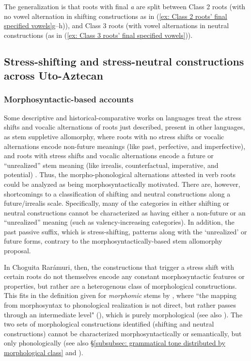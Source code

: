     \z

The generalization is that roots with final \textit{a} are split between Class 2 roots (with no vowel alternation in shifting constructions as in (\ref{ex: Class 2 roots’ final specified vowels}g--h)), and Class 3 roots (with vowel alternations in neutral constructions (as in (\ref{ex: Class 3 roots’ final specified vowels})).

\subsection{Stress-shifting and stress-neutral constructions across Uto-Aztecan}
\label{subsec: semantic accounts of shifting and neutral constructions in Uto-Aztecan}

\subsubsection{Morphosyntactic-based accounts}
\label{subsubsec: morphosyntactic and semantic accounts}

Some descriptive and historical-comparative works on  languages treat the stress shifts and vocalic alternations of roots just described, present in other  languages, as stem suppletive allomorphy, where roots with no stress shifts or vocalic alternations encode non-future meanings (like past, perfective, and imperfective), and roots with stress shifts and vocalic alternations encode a future or ``unrealized'' stem meaning (like irrealis, counterfactual, imperative, and potential) \citep[][133]{langacker1977uto}. Thus, the morpho-phonological alternations attested in verb roots could be analyzed as being morphosyntactically motivated. There are, however, shortcomings to a classification of shifting and neutral constructions along a future/irrealis scale. Specifically, many of the categories in either shifting or neutral constructions cannot be characterized as having either a non-future or an ``unrealized'' meaning (such as valency-increasing categories). In addition, the past passive suffix, which is stress-shifting, patterns along with the ‘unrealized’ or future forms, contrary to the morphosyntactically-based stem allomorphy proposal.

In Choguita Rarámuri, then, the constructions that trigger a stress shift with certain roots do not themselves encode any constant morphosyntactic features or properties, but rather are a heterogenous class of morphological constructions. This fits in the definition given for \textit{morphomic} stems by \citet{aronoff1994morphology}, where ``the mapping from morphosyntax to phonological realization is not direct, but rather passes through an intermediate level" (\citeyear[25]{aronoff1994morphology}), which is purely morphological (see also \citealt{blevins2003stems}). The two sets of morphological constructions identified (shifting and neutral constructions) cannot be characterized morphosyntactically or semantically, but only phonologically (see also §\ref{subsubsec: grammatical tone distributed by morphological class} and \citealt{caballero2021grammatical}).


